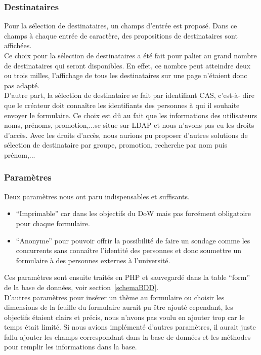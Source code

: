 \documentclass{sigplanconf}
\begin{document}
\subsubsection{Destinataires}
Pour la sélection de destinataires, un champs d’entrée est proposé. Dans ce champs à chaque entrée de caractère, des propositions de destinataires sont affichées.\\
Ce choix pour la sélection de destinataires a été fait pour palier au grand nombre de destinataires qui seront disponibles. En effet, ce nombre peut atteindre deux ou trois milles, l’affichage de tous les destinataires sur une page n’étaient donc pas adapté.\\
D’autre part, la sélection de destinataire se fait par identifiant CAS, c’est-à- dire que le créateur doit connaître les identifiants des personnes à qui il souhaite envoyer le formulaire. Ce choix est dû au fait que les informations des utilisateurs noms, prénoms, promotion,...se situe sur LDAP et nous n'avons pas eu les droits d'accès. Avec les droits d'accès, nous aurions pu proposer d'autres solutions de sélection de destinataire par groupe, promotion, recherche par nom puis prénom,...

\subsubsection{Paramètres}\label{sec:parametres}%
Deux paramètres nous ont paru indispensables et suffisants. %
\begin{itemize}
\item “Imprimable” car dans les objectifs du DoW mais pas forcément obligatoire pour chaque formulaire.
\item “Anonyme” pour pouvoir offrir la possibilité de faire un sondage comme les concurrents sans connaître l’identité des personnes et donc soumettre un formulaire à des personnes externes à l’université.
\end{itemize}
Ces paramètres sont ensuite traités en PHP et sauvegardé dans la table ``form'' de la base de données, voir section~\ref{schemaBDD}.\\

D'autres paramètres pour insérer un thème au formulaire ou choisir les dimensions de la feuille du formulaire aurait pu être ajouté cependant, les objectifs étaient clairs et précis, nous n'avons pas voulu en ajouter trop car le temps était limité. Si nous avions implémenté d'autres paramètres, il aurait juste fallu ajouter les champs correspondant dans la base de données et les méthodes pour remplir les informations dans la base.
\end{document}
